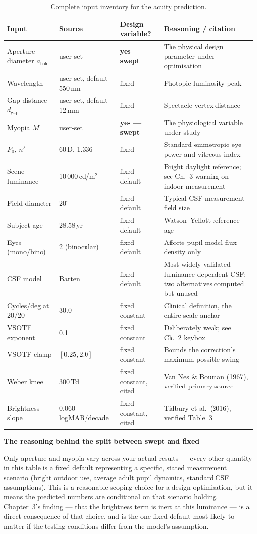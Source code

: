 \documentclass[11pt]{report}
\newenvironment{keybox}[1]%
{\par\vspace{6pt}\begin{lrbox}{\kbsave}\begin{minipage}{0.88\textwidth}%
{\bfseries\color{hbblue}#1}\par\vspace{4pt}\ignorespaces}%
{\end{minipage}\end{lrbox}%
\begin{center}\setlength{\fboxrule}{1.2pt}\setlength{\fboxsep}{7pt}%
\fcolorbox{hbblue}{boxgrey}{\usebox{\kbsave}}\end{center}\vspace{6pt}\par}
\begin{document}
\begin{longtable}{p{3.2cm}p{2.6cm}p{2.7cm}p{5.0cm}}
\caption{Complete input inventory for the acuity prediction.}\\
\toprule
\textbf{Input} & \textbf{Source} & \textbf{Design variable?} & \textbf{Reasoning / citation} \\
\midrule
\endhead
Aperture diameter $a_{\text{hole}}$ & user-set & \textbf{yes --- swept} & The physical design parameter
under optimisation \\
Wavelength & user-set, default 550\,nm & fixed & Photopic luminosity peak \\
Gap distance $d_{\text{gap}}$ & user-set, default 12\,mm & fixed & Spectacle vertex distance \\
Myopia $M$ & user-set & \textbf{yes --- swept} & The physiological variable under study \\
$P_0$, $n'$ & 60\,D, 1.336 & fixed & Standard emmetropic eye power and vitreous index \\
Scene luminance & 10\,000\,cd/m$^2$ & fixed default & Bright daylight reference; see
Ch.~3 warning on indoor measurement \\
Field diameter & 20$^\circ$ & fixed default & Typical CSF measurement field size \\
Subject age & 28.58\,yr & fixed default & Watson--Yellott reference age \\
Eyes (mono/bino) & 2 (binocular) & fixed default & Affects pupil-model flux density only \\
CSF model & Barten & fixed default & Most widely validated luminance-dependent CSF; two
alternatives computed but unused \\
Cycles/deg at 20/20 & 30.0 & fixed constant & Clinical definition, the entire scale anchor \\
VSOTF exponent & 0.1 & fixed constant & Deliberately weak; see Ch.~2 keybox \\
VSOTF clamp & $[0.25, 2.0]$ & fixed constant & Bounds the correction's maximum possible swing \\
Weber knee & 300\,Td & fixed constant, cited & Van Nes \& Bouman (1967), verified primary source \\
Brightness slope & 0.060 logMAR/decade & fixed constant, cited & Tidbury et al.\ (2016), verified
Table~3 \\
\bottomrule
\end{longtable}

\begin{keybox}{The reasoning behind the split between swept and fixed}
Only aperture and myopia vary across your actual results --- every other quantity in this table is a
fixed default representing a specific, stated measurement scenario (bright outdoor use, average adult
pupil dynamics, standard CSF assumptions). This is a reasonable scoping choice for a design
optimisation, but it means the predicted numbers are conditional on that scenario holding. Chapter~3's
finding --- that the brightness term is inert at this luminance --- is a direct consequence of that
choice, and is the one fixed default most likely to matter if the testing conditions differ from the
model's assumption.
\end{keybox}
\end{document}
